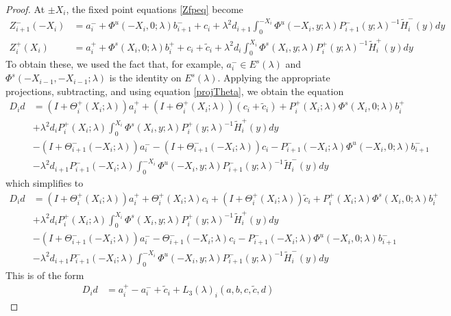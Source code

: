 \documentclass[thesis.tex]{subfiles}
\begin{document}
\begin{lemma}
\begin{proof}
At $\pm X_i$, the fixed point equations \eqref{Zfpeq} become
\begin{align*}
Z_{i+1}^-(-X_i) &= a_i^- + \Phi^u(-X_i, 0; \lambda) b_{i+1}^- + c_i 
+ \lambda^2 d_{i+1} \int_0^{-X_i} \Phi^u(-X_i, y; \lambda) P_{i+1}^-(y; \lambda)^{-1} \tilde{H}_i^-(y) dy \\
Z_i^+(X_i) &= a_i^+ + \Phi^s(X_i, 0; \lambda) b_i^+ + c_i + \tilde{c}_i 
+ \lambda^2 d_i \int_0^{X_i} \Phi^s(X_i, y; \lambda) P_i^+(y; \lambda)^{-1} \tilde{H}_i^+(y) dy
\end{align*}
To obtain these, we used the fact that, for example, $a_i^- \in E^s(\lambda)$ and $\Phi^s(-X_{i-1}, -X_{i-1}; \lambda)$ is the identity on $E^s(\lambda)$. Applying the appropriate projections, subtracting, and using equation \eqref{projTheta}, we obtain the equation 
\begin{align*}
D_i d &= (I + \Theta_i^+(X_i; \lambda))a_i^+ + (I + \Theta_i^+(X_i; \lambda))(c_i + \tilde{c}_i) + P_i^+(X_i; \lambda)\Phi^s(X_i, 0; \lambda) b_i^+ \\
&+ \lambda^2 d_i P_i^+(X_i; \lambda) \int_0^{X_i} \Phi^s(X_i, y; \lambda) P_i^+(y; \lambda)^{-1} \tilde{H}_i^+(y) dy \\
&- (I + \Theta_{i+1}^-(-X_i; \lambda))a_i^- - (I + \Theta_{i+1}^-(-X_i; \lambda))c_i - P_{i+1}^-(-X_i; \lambda)\Phi^u(-X_i, 0; \lambda) b_{i+1}^- \\ 
&- \lambda^2 d_{i+1} P_{i+1}^-(-X_i; \lambda) \int_0^{-X_i} \Phi^u(-X_i, y; \lambda) P_{i+1}^-(y; \lambda)^{-1} \tilde{H}_i^-(y) dy
\end{align*}
which simplifies to
\begin{align*}
D_i d &= (I + \Theta_i^+(X_i; \lambda))a_i^+ + \Theta_i^+(X_i; \lambda)c_i + (I + \Theta_i^+(X_i; \lambda))\tilde{c}_i + P_i^+(X_i; \lambda)\Phi^s(X_i, 0; \lambda) b_i^+ \\
&+ \lambda^2 d_i P_i^+(X_i; \lambda) \int_0^{X_i} \Phi^s(X_i, y; \lambda) P_i^+(y; \lambda)^{-1} \tilde{H}_i^+(y) dy \\
&- (I + \Theta_{i+1}^-(-X_i; \lambda))a_i^- - \Theta_{i+1}^-(-X_i; \lambda)c_i - P_{i+1}^-(-X_i; \lambda)\Phi^u(-X_i, 0; \lambda) b_{i+1}^- \\ 
&- \lambda^2 d_{i+1} P_{i+1}^-(-X_i; \lambda) \int_0^{-X_i} \Phi^u(-X_i, y; \lambda) P_{i+1}^-(y; \lambda)^{-1} \tilde{H}_i^-(y) dy
\end{align*}
This is of the form
\begin{align}\label{Dideq1}
D_i d &= a_i^+ - a_i^- + \tilde{c}_i + L_3(\lambda)_i(a, b, c, \tilde{c}, d)

\end{align}
\end{proof}
\end{lemma}
\end{document}
